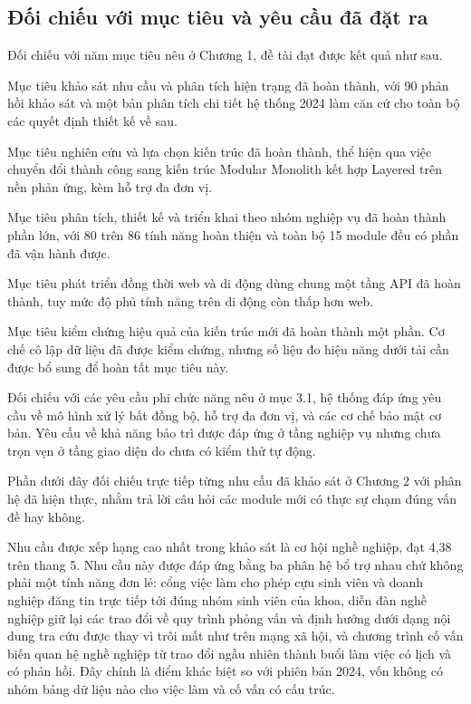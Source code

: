 \documentclass[12pt,a4paper,oneside]{report}
\begin{document}
\subsection{Đối chiếu với mục tiêu và yêu cầu đã đặt ra}

Đối chiếu với năm mục tiêu nêu ở Chương 1, đề tài đạt được kết quả như sau.

Mục tiêu khảo sát nhu cầu và phân tích hiện trạng đã hoàn thành, với 90 phản hồi khảo sát và một bản phân tích chi tiết hệ thống 2024 làm căn cứ cho toàn bộ các quyết định thiết kế về sau.

Mục tiêu nghiên cứu và lựa chọn kiến trúc đã hoàn thành, thể hiện qua việc chuyển đổi thành công sang kiến trúc Modular Monolith kết hợp Layered trên nền phản ứng, kèm hỗ trợ đa đơn vị.

Mục tiêu phân tích, thiết kế và triển khai theo nhóm nghiệp vụ đã hoàn thành phần lớn, với 80 trên 86 tính năng hoàn thiện và toàn bộ 15 module đều có phần đã vận hành được.

Mục tiêu phát triển đồng thời web và di động dùng chung một tầng API đã hoàn thành, tuy mức độ phủ tính năng trên di động còn thấp hơn web.

Mục tiêu kiểm chứng hiệu quả của kiến trúc mới đã hoàn thành một phần. Cơ chế cô lập dữ liệu đã được kiểm chứng, nhưng số liệu đo hiệu năng dưới tải cần được bổ sung để hoàn tất mục tiêu này.

Đối chiếu với các yêu cầu phi chức năng nêu ở mục 3.1, hệ thống đáp ứng yêu cầu về mô hình xử lý bất đồng bộ, hỗ trợ đa đơn vị, và các cơ chế bảo mật cơ bản. Yêu cầu về khả năng bảo trì được đáp ứng ở tầng nghiệp vụ nhưng chưa trọn vẹn ở tầng giao diện do chưa có kiểm thử tự động.

Phần dưới đây đối chiếu trực tiếp từng nhu cầu đã khảo sát ở Chương 2 với phân hệ đã hiện thực, nhằm trả lời câu hỏi các module mới có thực sự chạm đúng vấn đề hay không.

Nhu cầu được xếp hạng cao nhất trong khảo sát là cơ hội nghề nghiệp, đạt 4,38 trên thang 5. Nhu cầu này được đáp ứng bằng ba phân hệ bổ trợ nhau chứ không phải một tính năng đơn lẻ: cổng việc làm cho phép cựu sinh viên và doanh nghiệp đăng tin trực tiếp tới đúng nhóm sinh viên của khoa, diễn đàn nghề nghiệp giữ lại các trao đổi về quy trình phỏng vấn và định hướng dưới dạng nội dung tra cứu được thay vì trôi mất như trên mạng xã hội, và chương trình cố vấn biến quan hệ nghề nghiệp từ trao đổi ngẫu nhiên thành buổi làm việc có lịch và có phản hồi. Đây chính là điểm khác biệt so với phiên bản 2024, vốn không có nhóm bảng dữ liệu nào cho việc làm và cố vấn có cấu trúc.
\end{document}
